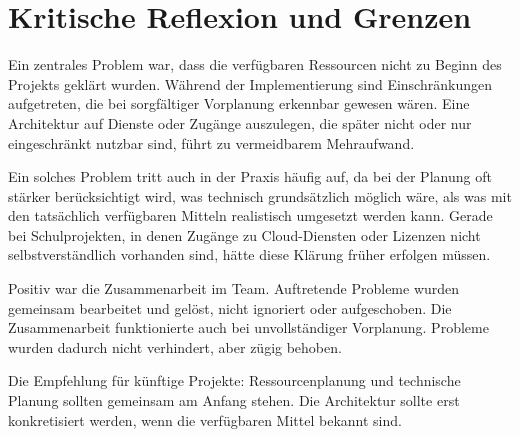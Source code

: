 \section{Kritische Reflexion und Grenzen}

Ein zentrales Problem war, dass die verfügbaren Ressourcen nicht zu Beginn des Projekts geklärt wurden. Während der Implementierung sind Einschränkungen aufgetreten, die bei sorgfältiger Vorplanung erkennbar gewesen wären. Eine Architektur auf Dienste oder Zugänge auszulegen, die später nicht oder nur eingeschränkt nutzbar sind, führt zu vermeidbarem Mehraufwand.

Ein solches Problem tritt auch in der Praxis häufig auf, da bei der Planung oft
stärker berücksichtigt wird, was technisch grundsätzlich möglich wäre, als was
mit den tatsächlich verfügbaren Mitteln realistisch umgesetzt werden kann. Gerade
bei Schulprojekten, in denen Zugänge zu Cloud-Diensten oder Lizenzen nicht
selbstverständlich vorhanden sind, hätte diese Klärung früher erfolgen müssen.

Positiv war die Zusammenarbeit im Team. Auftretende Probleme wurden gemeinsam bearbeitet und gelöst, nicht ignoriert oder aufgeschoben. Die Zusammenarbeit funktionierte auch bei unvollständiger Vorplanung. Probleme wurden dadurch nicht verhindert, aber zügig behoben.

Die Empfehlung für künftige Projekte: Ressourcenplanung und technische Planung sollten gemeinsam am Anfang stehen. Die Architektur sollte erst konkretisiert werden, wenn die verfügbaren Mittel bekannt sind.
